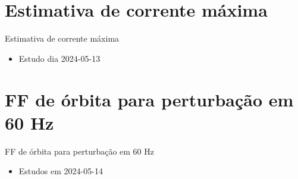 \documentclass[aspectratio=169]{beamer}            %
\begin{document}
\section{Estimativa de corrente máxima}

\begin{frame}{Estimativa de corrente máxima}

{\footnotesize
\begin{itemize}
    \item Estudo dia 2024-05-13
\end{itemize}
}
\end{frame}



\section{FF de órbita para perturbação em 60 Hz}

\begin{frame}{FF de órbita para perturbação em 60 Hz}

\begin{itemize}
    \setlength\itemsep{1em}
    \item Estudos em 2024-05-14
\end{itemize}

\end{frame}





\end{document}
